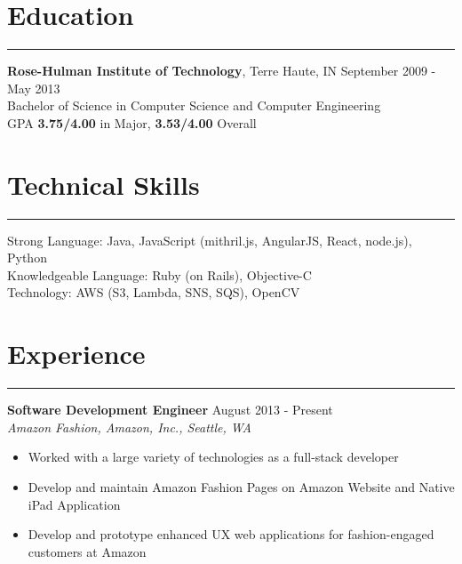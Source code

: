 \documentclass[line]{res} %
\begin{document}

\address{
  2801 1st Ave, Unit 613 \\
  Seattle, WA 98121 \\
  (812) 575-0373 \\
  simon@divby0.io \\
  \underline{http://www.divby0.io}
}
\address{\textbf{Open to Relocate to Bay Area}}

\begin{resume}

  \section{Education}
  \rule{\textwidth}{1pt}
    \textbf{Rose-Hulman Institute of Technology}, Terre Haute, IN
    \hfill September 2009 - May 2013 \\
    Bachelor of Science in Computer Science and Computer Engineering \\
    GPA \textbf{3.75/4.00} in Major, \textbf{3.53/4.00} Overall

  \section{Technical Skills}
  \rule{\textwidth}{1pt}
    Strong Language: Java, JavaScript (mithril.js, AngularJS, React, node.js), Python \\
    Knowledgeable Language: Ruby (on Rails), Objective-C \\
    Technology: AWS (S3, Lambda, SNS, SQS), OpenCV

  \section{Experience}
  \rule{\textwidth}{1pt}
    \textbf{Software Development Engineer}
    \hfill August 2013 - Present \\
    \textit{Amazon Fashion, Amazon, Inc., Seattle, WA}
    \begin{itemize} \itemsep -2pt  %
      \item Worked with a large variety of technologies as a full-stack developer
      \item Develop and maintain Amazon Fashion Pages on Amazon Website and Native iPad Application
      \item Develop and prototype enhanced UX web applications for fashion-engaged customers at Amazon
    \end{itemize}



\end{resume}
\end{document}
